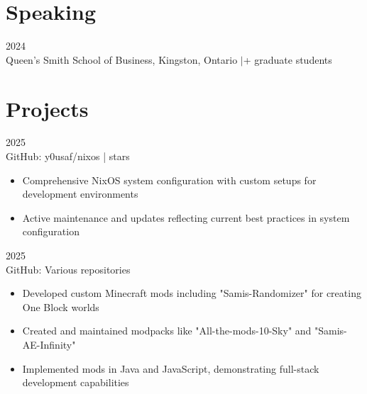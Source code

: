 \documentclass[letterpaper,10pt]{article}
\begin{document}
\section{Speaking}

\hspace{0.15in}{\bfseries Guest Lecturer on AI and Synthetic Data Generation for MMA Program} \hfill {\small 2024} \\
\hspace{0.15in}Queen's Smith School of Business, Kingston, Ontario \enspace$|$+ graduate students

\vspace{1pt}

\section{Projects}

\hspace{0.15in}{\bfseries NixOS Configuration} \hfill {\small 2025} \\
\hspace{0.15in}GitHub: y0usaf/nixos \enspace |  stars
\vspace{-1pt}
\begin{itemize}[leftmargin=0.35in, itemsep=-1pt, topsep=1pt, labelsep=0.035in]
\item Comprehensive NixOS system configuration with custom setups for development environments
\item Active maintenance and updates reflecting current best practices in system configuration
\end{itemize}
\vspace{1pt}

\hspace{0.15in}{\bfseries Minecraft Modding Projects} \hfill {\small 2025} \\
\hspace{0.15in}GitHub: Various repositories
\vspace{-1pt}
\begin{itemize}[leftmargin=0.35in, itemsep=-1pt, topsep=1pt, labelsep=0.035in]
\item Developed custom Minecraft mods including "Samis-Randomizer" for creating One Block worlds
\item Created and maintained modpacks like "All-the-mods-10-Sky" and "Samis-AE-Infinity"
\item Implemented mods in Java and JavaScript, demonstrating full-stack development capabilities
\end{itemize}
\vspace{1pt}
\end{document}
